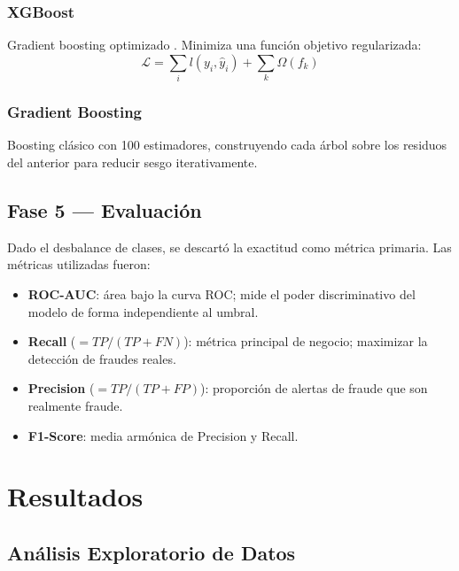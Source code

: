 \documentclass[12pt, a4paper]{article}
\begin{document}
\subsubsection{XGBoost}
Gradient boosting optimizado \cite{chen2016xgboost}. Minimiza una función
objetivo regularizada:
\begin{equation}
\mathcal{L} = \sum_i l\!\left(y_i, \hat{y}_i\right) + \sum_k \Omega(f_k)
\end{equation}

\subsubsection{Gradient Boosting}
Boosting clásico con 100 estimadores, construyendo cada árbol sobre los
residuos del anterior para reducir sesgo iterativamente.

\subsection{Fase 5 — Evaluación}

Dado el desbalance de clases, se descartó la exactitud como métrica
primaria. Las métricas utilizadas fueron:

\begin{itemize}
  \item \textbf{ROC-AUC}: área bajo la curva ROC; mide el poder
        discriminativo del modelo de forma independiente al umbral.
  \item \textbf{Recall} ($= TP / (TP + FN)$): métrica principal de negocio;
        maximizar la detección de fraudes reales.
  \item \textbf{Precision} ($= TP / (TP + FP)$): proporción de alertas de
        fraude que son realmente fraude.
  \item \textbf{F1-Score}: media armónica de Precision y Recall.
\end{itemize}

\section{Resultados}

\subsection{Análisis Exploratorio de Datos}
\end{document}
